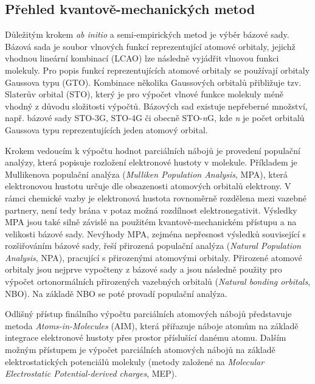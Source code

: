\subsection{Přehled kvantově-mechanických metod}
Důležitým krokem \textit{ab initio} a semi-empirických metod je výběr bázové sady. Bázová sada je soubor vlnových funkcí reprezentující atomové orbitaly, jejichž vhodnou lineární kombinací (LCAO) lze následně vyjádřit vlnovou funkci molekuly. %
Pro popis funkcí reprezentujících atomové orbitaly se používají orbitaly Gaussova typu (GTO). Kombinace několika Gaussových orbitalů přibližuje tzv. Slaterův orbital (STO), který je pro výpočet vlnové funkce molekuly méně vhodný z důvodu složitosti výpočtů. Bázových sad existuje nepřeberné množství, např. bázové sady STO-3G, STO-4G či obecně STO-\textit{n}G, kde \textit{n} je počet orbitalů Gaussova typu reprezentujících jeden atomový orbital.

Krokem vedoucím k výpočtu hodnot parciálních nábojů je provedení populační analýzy, která popisuje rozložení elektronové hustoty v molekule. Příkladem je Mullikenova populační analýza (\textit{Mulliken Population Analysis}, MPA), %
která elektronovou hustotu určuje dle obsazenosti atomových orbitalů  elektrony. V rámci chemické vazby je elektronová hustota rovnoměrně rozdělena mezi vazebné partnery, není tedy brána v potaz možná rozdílnost elektronegativit. Výsledky MPA jsou také silně závislé na použitém kvantově-mechanickém přístupu a na velikosti bázové sady.
Nevýhody MPA, zejména nepřesnost výsledků související s rozšiřováním bázové sady, řeší přirozená populační analýza (\textit{Natural Population Analysis}, NPA), pracující s přirozenými atomovými orbitaly. 
Přirozené atomové orbitaly jsou nejprve vypočteny z bázové sady a jsou následně použity pro výpočet ortonormálních přirozených vazebných orbitalů (\textit{Natural bonding orbitals}, NBO). Na základě NBO se poté provadí populační analýza. %

Odlišný přístup finálního výpočtu parciálních atomových nábojů představuje metoda \textit{Atoms-in-Molecules} (AIM), která přiřazuje náboje atomům na základě integrace elektronové hustoty přes prostor příslušící danému atomu. Dalším možným přístupem je výpočet parciálních atomových nábojů na základě elektrostatických potenciálů molekuly (metody založené na \textit{Molecular Electrostatic Potential-derived charges}, MEP). 


